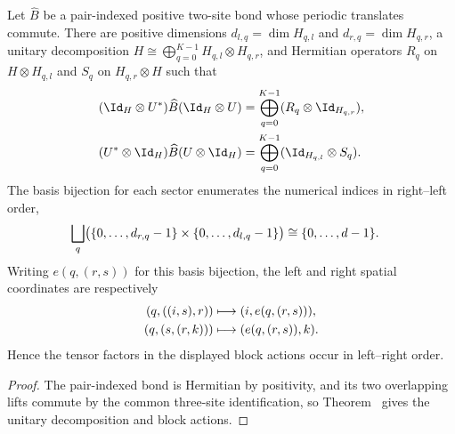 \begin{lemma}
    \label{thm:mpdo_eta_local_pair_bond_unitary_block_actions}
    \leanok
    Let $\widehat B$ be a pair-indexed positive two-site bond whose periodic
    translates commute. There are positive dimensions
    $d_{l,q}=\dim H_{q,l}$ and $d_{r,q}=\dim H_{q,r}$, a unitary decomposition
    $H\cong\bigoplus_{q=0}^{K-1}H_{q,l}\otimes H_{q,r}$,
    and Hermitian operators $R_q$ on $H\otimes H_{q,l}$ and $S_q$ on
    $H_{q,r}\otimes H$ such that
    \begin{align}
        (\Id_H\otimes U^*)\widehat B(\Id_H\otimes U)
         & =\bigoplus_{q=0}^{K-1}
        (R_q\otimes\Id_{H_{q,r}}),
        \notag                    \\
        (U^*\otimes\Id_H)\widehat B(U\otimes\Id_H)
         & =\bigoplus_{q=0}^{K-1}
        (\Id_{H_{q,l}}\otimes S_q).
        \notag
    \end{align}
    The basis bijection for each sector enumerates the numerical indices in
    right--left order,
    \begin{align}
        \bigsqcup_q\bigl(\{0,\ldots,d_{r,q}-1\}
        \times\{0,\ldots,d_{l,q}-1\}\bigr)
         & \cong\{0,\ldots,d-1\}.
        \notag
    \end{align}
    Writing $e(q,(r,s))$ for this basis bijection, the left and right spatial
    coordinates are respectively
    \begin{align}
        (q,((i,s),r))
         & \longmapsto(i,e(q,(r,s))),
        \notag                        \\
        (q,(s,(r,k)))
         & \longmapsto(e(q,(r,s)),k).
        \notag
    \end{align}
    Hence the tensor factors in the displayed block actions occur in
    left--right order.
\end{lemma}

\begin{proof}\leanok
    The pair-indexed bond is Hermitian by positivity, and its two overlapping
    lifts commute by the common three-site identification, so
    Theorem~\cite[``Explicit unitary block actions for commuting overlaps'']{QICLean2026Blueprint}
    gives the unitary decomposition and block actions.
\end{proof}

